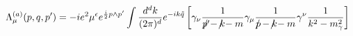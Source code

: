 \begin{equation}
\Lambda_{\mu}^{(a)}(p,q,p')
=-ie^{2}\mu^{\epsilon}e^{\frac{i}{2}p\wedge p'}\int
\frac{d^{d}k}{(2\pi)^{d}}e^{-ik\tilde{q}}\left[\gamma_{\nu}\frac{1}{p'\hspace{-0.25cm}/-k\hspace{-0.25cm}/-m}\gamma_{\mu}
\frac{1}{p\hspace{-0.2cm}/-k\hspace{-0.25cm}/-m}\gamma^{\nu}\frac{1}{k^{2}-
m^{2}_{\gamma}}\right]
\end{equation}

